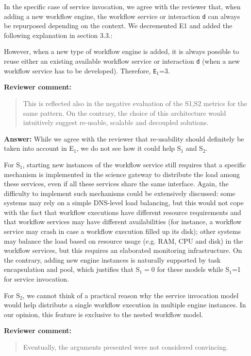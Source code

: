 \documentclass[a4]{article}
\newenvironment{review}%
{\textbf{Reviewer comment:}\begin{quote}}%
{\end{quote}}%
\newcommand{\answer}[1]{\textbf{Answer:} #1}
\newcommand{\revised}[1]{\color{blue} #1\color{black}}
\begin{document}
In the specific case of service invocation, we agree with the reviewer
that, when adding a new workflow engine, the workflow service or interaction \texttt{d} can always be repurposed depending on the context. We decremented E1 and added the following explanation in section 3.3.:

\revised{However, when a new type of workflow engine is added, it is always possible to reuse either an existing available workflow service or interaction \texttt{d} (when a new workflow service has to be developed). Therefore, \texttt{E$_1$}=3}.

\begin{review}
 This is reflected also in the negative evaluation of the S1,S2 metrics for the same pattern. On the contrary, the choice of this architecture would intuitively suggest re-usable, scalable and decoupled solutions.
\end{review}

\answer{While we agree with the reviewer that re-usability should
  definitely be taken into account in E$_1$, we do not see how it
  could help S$_1$ and S$_2$.

  For S$_1$, starting new instances of the workflow service still
  requires that a specific mechanism is implemented in the science
  gateway to distribute the load among these services, even if all
  these services share the same interface. Again, the difficulty to
  implement such mechanisms could be extensively discussed: some
  systems may rely on a simple DNS-level load balancing, but this
  would not cope with the fact that workflow executions have different
  resource requirements and that workflow services may have different
  availabilities (for instance, a workflow service may crash in case a
  workflow execution filled up its disk); other systems may balance
  the load based on resource usage (e.g. RAM, CPU and disk) in the
  workflow services, but this requires an elaborated monitoring
  infrastructure. On the contrary, adding new engine instances is
  naturally supported by task encapsulation and pool, which justifies
  that S$_1=0$ for these models while S$_1$=1 for service invocation.

  For S$_2$, we cannot think of a practical reason why the service
  invocation model would help distribute a single workflow execution
  in multiple engine instances. In our opinion, this feature is
  exclusive to the nested workflow model. }

\begin{review}
 Eventually, the arguments presented were not considered convincing.
\end{review}
\end{document}

